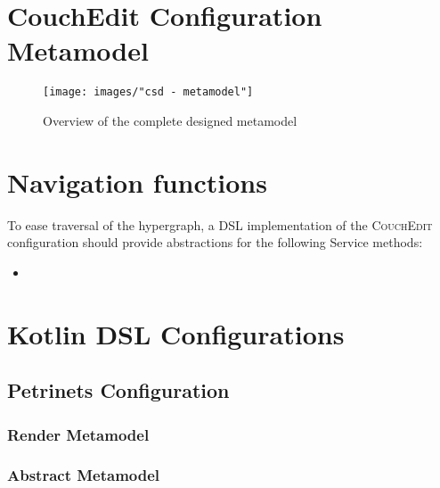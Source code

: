 \chapter{CouchEdit Configuration Metamodel}
\begin{sidewaysfigure}
\centering
\texttt{[image: images/"csd - metamodel"]}
\caption{Overview of the complete designed metamodel}
\label{fig:complete-metamodel}
\end{sidewaysfigure}

\chapter{Navigation functions}
\label{app:navigationfunctions}

To ease traversal of the hypergraph, a DSL implementation of the \textsc{CouchEdit} configuration should provide abstractions for the following Service methods:

\begin{itemize}
  \item {}
\end{itemize}


\chapter{Kotlin DSL Configurations}
\section{Petrinets Configuration}
\label{app:petri}
\subsection*{Render Metamodel}


\subsection*{Abstract Metamodel}


